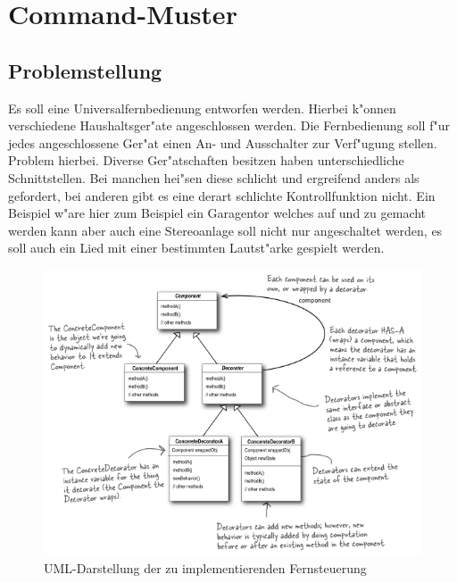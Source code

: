 \section{Command-Muster}

\subsection{Problemstellung}
Es soll eine Universalfernbedienung entworfen werden. Hierbei k"onnen verschiedene Haushaltsger"ate angeschlossen werden. Die Fernbedienung soll f"ur jedes angeschlossene Ger"at einen An- und Ausschalter zur Verf"ugung stellen. Problem hierbei. Diverse Ger"atschaften besitzen haben unterschiedliche Schnittstellen. Bei manchen hei"sen diese schlicht und ergreifend anders als gefordert, bei anderen gibt es eine derart schlichte Kontrollfunktion nicht. Ein Beispiel w"are hier zum Beispiel ein Garagentor welches auf und zu gemacht werden kann aber auch eine Stereoanlage soll nicht nur angeschaltet werden, es soll auch ein Lied mit einer bestimmten Lautst"arke gespielt werden. 


\begin{figure}
	\centering
	\includegraphics{decorator/img/decoratorUML}
	\caption{UML-Darstellung der zu implementierenden Fernsteuerung}
	\label{fig:commandRemote}
\end{figure}
